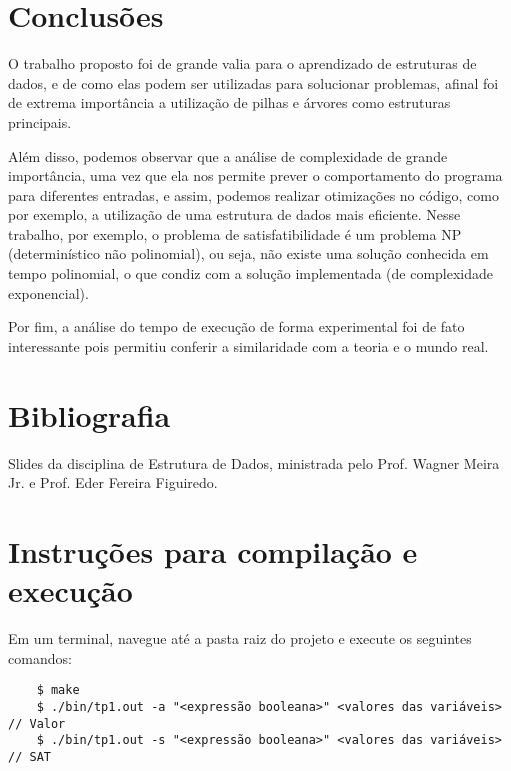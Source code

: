 \documentclass{article}
\begin{document}
\section{Conclusões}

O trabalho proposto foi de grande valia para o aprendizado de estruturas de dados, e de como elas podem ser utilizadas para solucionar problemas, afinal foi de extrema importância a utilização de pilhas e árvores como estruturas principais.  

Além disso, podemos observar que a análise de complexidade de grande importância, uma vez que ela nos permite prever o comportamento do programa para diferentes entradas, e assim, podemos realizar otimizações no código, como por exemplo, a utilização de uma estrutura de dados mais eficiente. Nesse trabalho, por exemplo, o problema de satisfatibilidade é um problema NP (determinístico não polinomial), ou seja, não existe uma solução conhecida em tempo polinomial, o que condiz com a solução implementada (de complexidade exponencial).

Por fim, a análise do tempo de execução de forma experimental foi de fato interessante pois permitiu conferir a similaridade com a teoria e o mundo real.
\section*{Bibliografia}

Slides da disciplina de Estrutura de Dados, ministrada pelo Prof. Wagner Meira Jr. e Prof. Eder Fereira Figuiredo.


\section*{Instruções para compilação e execução}

Em um terminal, navegue até a pasta raiz do projeto e execute os seguintes comandos:

\begin{verbatim}
    $ make
    $ ./bin/tp1.out -a "<expressão booleana>" <valores das variáveis> // Valor 
    $ ./bin/tp1.out -s "<expressão booleana>" <valores das variáveis> // SAT
\end{verbatim}
\end{document}
